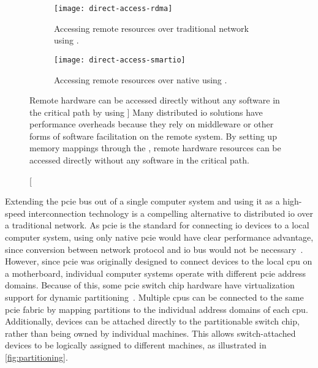 \begin{figure}
    \centering
    \begin{subfigure}{\linewidth}
        \centering
        \texttt{[image: direct-access-rdma]}
        \caption{Accessing remote resources over traditional network using .}
    \end{subfigure}
    \par\vspace{5mm}
    \begin{subfigure}{\linewidth}
        \centering
        \texttt{[image: direct-access-smartio]}
        \caption{Accessing remote resources over native  using .}
    \end{subfigure}
    \caption
    [Remote hardware can be accessed directly without any software in the critical path by using ]
    {Many distributed \gls{io} solutions have performance overheads because they rely on \gls{middleware} or other forms of software facilitation on the remote system. By setting up memory mappings through the , remote hardware resources can be accessed directly without any software in the critical path.}
    \label{fig:direct-access}
\end{figure}



Extending the \gls{pcie} bus out of a single computer system and using it as a high-speed interconnection technology is a compelling alternative to distributed \gls{io} over a traditional network.
%
As \gls{pcie} is the standard for connecting \gls{io} devices to a local computer system, using only native \gls{pcie} would have clear performance advantage, since conversion between network protocol and \gls{io} bus would not be necessary~\cite{Fountain2005,Ravindran2008,whitepaper:Regula2004}.
%
However, since \gls{pcie} was originally designed to connect devices to the local \gls{cpu} on a motherboard, individual computer systems operate with different \gls{pcie} address domains.
%
Because of this, some \gls{pcie} switch chip hardware have virtualization support for dynamic partitioning~\cite{Chung2018,whitepaper:IDT,whitepaper:Microsemi,url:rackscale,url:liqid,url:gigaio}. 
%
Multiple \glspl{cpu} can be connected to the same \gls{pcie} fabric by mapping partitions to the individual address domains of each \gls{cpu}.
%
Additionally, devices can be attached directly to the partitionable switch chip, rather than being owned by individual machines.
%
This allows switch-attached devices to be logically assigned to different machines, as illustrated in \cref{fig:partitioning}.


